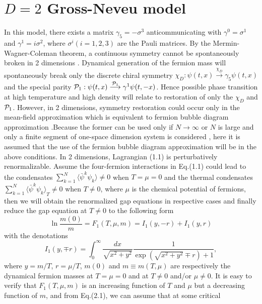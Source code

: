 \documentclass[a4paper,eqsecnum]{revtex4}
\begin{document}
\section{$D=2$ Gross-Neveu model\label{sec:2D}}
\indent In this model\cite{kn:17}, there exists a matrix 
$\gamma_5=-\sigma^3$ anticommunicating with $\gamma^0=\sigma^1$ and 
$\gamma^1=i\sigma^2$, where $\sigma^i(i=1,2,3)$ are the Pauli matrices. By the 
Mermin-Wagner-Coleman theorem, a continuous symmetry cannot be spontaneously broken 
in 2 dimensions \cite{kn:19}. Dynamical generation of the fermion mass will 
spontaneously break only the discrete chiral symmetry 
$\chi_D: \psi (t,x)\stackrel{\chi_D}{\longrightarrow} \gamma_5\psi 
(t,x)$ and  the special parity ${\cal P}_1 : \psi (t,x)\stackrel{{\cal 
P}_1}{\longrightarrow} \gamma^1\psi (t,-x)$. Hence possible phase transition at
high temperature and high density will relate to restoration of only the $\chi_D$
and ${\cal P}_1$. However, in 2 dimensions, symmetry restoration could occur only 
in the mean-field approximation \cite{kn:6,kn:20} which is equivalent to fermion 
bubble diagram approximation \cite{kn:17}.Because the former can be used only if 
$N\to \infty$ or $N$ is large and only a finite segment of one-space dimension
system is considered \cite{kn:20}, here it is assumed that the use of the fermion 
bubble diagram approximation will be in the above conditions. In 2 dimensions, 
Lagrangian (1.1) is perturbatively renormalizable. Assume the four-fermion 
interactions in Eq.(1.1) could lead to the condensates  
$\sum_{k=1}^N\langle\bar{\psi}^k\psi_k\rangle\neq 0$ when $T=\mu=0$ and the thermal 
condensates $\sum_{k=1}^N{\langle\bar{\psi}^k\psi_k\rangle}_T\neq 0$ when $T\neq 
0$, where $\mu$ is the chemical potential of fermions, then we will obtain the 
renormalized gap equations in respective cases and finally reduce the gap equation 
at $T\neq 0$ to the following form
\begin{equation}
\ln \frac{m(0)}{m}=F_1(T,\mu,m)=I_1(y,-r)+I_1(y,r)
\end{equation}%
with the denotations 
\begin{equation}
I_1(y,\mp r)=\int_{0}^{\infty}\frac{dx}{\sqrt{x^2+y^2}}
\frac{1}{\exp(\sqrt{x^2+y^2}\mp r)+1},
\end{equation}%
where $y=m/T$, $r=\mu/T$, $m(0)$ and $m\equiv m(T,\mu)$ are respectively the 
dynamical fermion masses at $T=\mu=0$ and at $T\neq 0$ and/or $\mu\neq 0$.  It is 
easy to verify that $F_1(T,\mu, m)$ is an increasing function of $T$ and $\mu$ but 
a decreasing function of $m$, and from  Eq.(2.1), we can assume that at  some critical 
\end{document}
